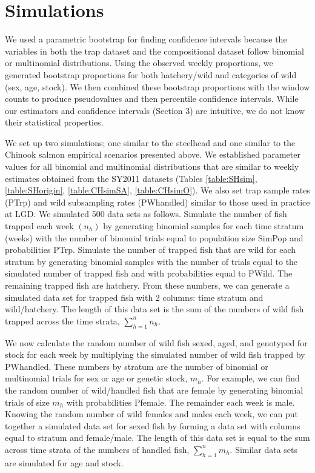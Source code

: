 \documentclass[11pt]{article}
\begin{document}
\section{Simulations}

We used a parametric bootstrap for finding confidence intervals because the variables in both the trap dataset and the compositional dataset follow binomial or multinomial distributions. Using the observed weekly proportions, we generated bootstrap proportions for both  hatchery/wild and categories of wild (sex, age, stock). We then combined these bootstrap proportions with the window counts to produce pseudovalues and then percentile confidence intervals. While our estimators and confidence intervals (Section 3) are intuitive, we do not know their statistical properties.

We set up two simulations; one similar to the steelhead and one similar to the Chinook salmon empirical scenarios presented above. We established parameter values for all binomial and multinomial distributions that are similar to weekly estimates obtained from the SY2011 datasets (Tables \ref{table:SHsim}, \ref{table:SHorigin}, \ref{table:CHsimSA}, \ref{table:CHsimO}). We also set trap sample rates (PTrp) and wild subsampling rates (PWhandled) similar to those used in practice at LGD. We simulated 500 data sets as follows. Simulate the number of fish trapped each week $(n_h)$ by generating binomial samples for each time stratum (weeks) with the number of binomial trials equal to population size SimPop and probabilities PTrp. Simulate the number of trapped fish that are wild for each stratum by generating binomial samples with the number of trials equal to the simulated number of trapped fish and with probabilities equal to PWild. The remaining trapped fish are hatchery. From these numbers, we can generate a simulated data set for trapped fish with 2 columns: time stratum and wild/hatchery. The length of this data set is the sum of the numbers of wild fish trapped across the time strata, \(\sum\limits_{h=1}^{n} n_h\).

We now calculate the random number of wild fish sexed, aged, and genotyped for stock for each week by multiplying the simulated number of wild fish trapped by PWhandled. These numbers by stratum are the number of binomial or multinomial trials for sex or age or genetic stock, \(m_h\). For example, we can find the random number of wild/handled fish that are female by generating binomial trials of size \(m_h\) with probabilities Pfemale. The remainder each week is male. Knowing the random number of wild females and males each week, we can put together a simulated data set for sexed fish by forming a data set with columns equal to stratum and female/male. The length of this data set is equal to the sum across time strata of the numbers of handled fish,  \(\sum\limits_{h=1}^{n} m_h\). Similar data sets are simulated for age and stock.
\end{document}
